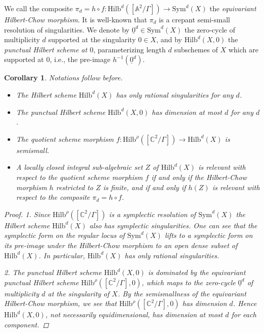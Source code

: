 \documentclass{amsart}[12pt]
\newtheorem{cor}[theorem]{Corollary}
\theoremstyle{definition}
\theoremstyle{remark}
\numberwithin{equation}{section}
\begin{document}
We call the composite $\pi_d = h \circ f: \mathrm{Hilb}^d([\mathbb{A}^2/\Gamma]) \to \mathrm{Sym}^d(X)$ the \textit{equivariant Hilbert-Chow morphism}. It is well-known that $\pi_d$ is a crepant semi-small resolution of singularities. We denote by $\underline{0}^d \in \mathrm{Sym}^d(X)$ the zero-cycle of multiplicity $d$ supported at the singularity $0 \in X$, and by $\mathrm{Hilb}^d(X, 0)$ the \textit{punctual Hilbert scheme at $0$}, parameterizing length $d$ subschemes of $X$ which are supported at $0$, i.e., the pre-image $h^{-1}(\underline{0}^d)$. 

\begin{cor}\label{semismall}
Notations follow before. 
\begin{itemize}
\item[1.] The Hilbert scheme $\mathrm{Hilb}^d(X)$ has only rational singularities for any $d$.
\item[2.] The punctual Hilbert scheme $\mathrm{Hilb}^d(X, 0)$ has dimension at most $d$ for any $d$.
\item[3.] The quotient scheme morphism $f: \mathrm{Hilb}^{\rho}([\mathbb{C}^2/\Gamma]) \to \mathrm{Hilb}^d(X)$ is semismall.
\item[4.] A locally closed integral sub-algebraic set $Z$ of $\mathrm{Hilb}^{d}(X)$ is relevant with respect to the quotient scheme morphism $f$ if and only if the Hilbert-Chow morphism $h$ restricted to $Z$ is finite, and if and only if $h(Z)$ is relevant with respect to the composite $\pi_d = h \circ f$.
\end{itemize}
\begin{proof}
1. Since $\mathrm{Hilb}^{\rho}([\mathbb{C}^2/\Gamma])$ is a symplectic resolution of $\mathrm{Sym}^d(X)$ the Hilbert scheme $\mathrm{Hilb}^d(X)$ also has symplectic singularities. One can see that the symplectic form on the regular locus of $\mathrm{Sym}^d(X)$ lifts to a symplectic form on its pre-image under the Hilbert-Chow morphism to an open dense subset of $\mathrm{Hilb}^d(X)$. In particular, $\mathrm{Hilb}^d(X)$ has only rational singularities. 

2. The punctual Hilbert scheme $\mathrm{Hilb}^d(X, 0)$ is dominated by the equivariant punctual Hilbert scheme $\mathrm{Hilb}^{\rho}([\mathbb{C}^2/\Gamma], 0)$, which maps to the zero-cycle $\underline{0}^d$ of multiplicity $d$ at the singularity of $X$. By the semismallness of the equivariant Hilbert-Chow morphism, we see that $\mathrm{Hilb}^{\rho}([\mathbb{C}^2/\Gamma], 0)$ has dimension $d$. Hence $\mathrm{Hilb}^d(X, 0)$, not necessarily equidimensional, has dimension at most $d$ for each component.


\end{proof}
\end{cor}
\end{document}
